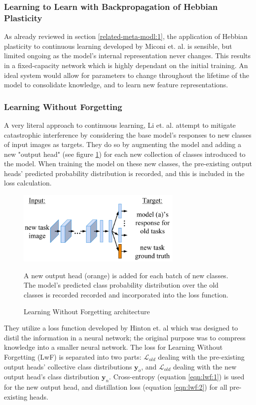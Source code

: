 \documentclass{report}
\begin{document}
	\subsubsection{Learning to Learn with Backpropagation of Hebbian Plasticity}
	As already reviewed in section \ref{related-meta-modl:1}, the application of Hebbian plasticity to continuous learning developed by Miconi et. al. \parencite{ltlwbohb} is sensible, but limited ongoing as the model's internal representation never changes. This results in a fixed-capacity network which is highly dependant on the initial training. An ideal system would allow for parameters to change throughout the lifetime of the model to consolidate knowledge, and to learn new feature representations.
	
	\subsubsection{Learning Without Forgetting}
	A very literal approach to continuous learning, Li et. al. \parencite{lwf} attempt to mitigate catastrophic interference by considering the base model's responses to new classes of input images as targets. They do so by augmenting the model and adding a new "output head" (see figure \ref{fig:lwf:1}) for each new collection of classes introduced to the model. When training the model on these new classes, the pre-existing output heads' predicted probability distribution is recorded, and this is included in the loss calculation. \newline
	\begin{figure}[h]
		\centering
		\includegraphics[width=8cm]{lwfarchitecture}
		\caption{Learning Without Forgetting architecture}
		A new output head (orange) is added for each batch of new classes. The model's predicted class probability distribution over the old classes is recorded recorded and incorporated into the loss function. 
		\label{fig:lwf:1}
	\end{figure}
	They utilize a loss function developed by Hinton et. al \parencite{distillation} which was designed to distil the information in a neural network; the original purpose was to compress knowledge into a smaller neural network. The loss for Learning Without Forgetting (LwF) is separated into two parts: $\mathcal{L}_{old}$ dealing with the pre-existing output heads' collective class distributions $\bm{y}_o$, and $\mathcal{L}_{old}$ dealing with the new output head's class distribution $\bm{y}_n$. Cross-entropy (equation \ref{eqn:lwf:1}) is used for the new output head, and distillation loss (equation \ref{eqn:lwf:2}) for all pre-existing heads. \par
\end{document}

